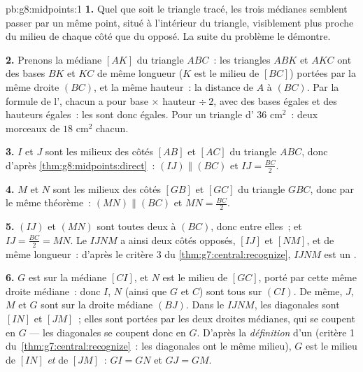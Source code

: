 \begin{solution}{pb:g8:midpoints:1}
\textbf{1.} Quel que soit le triangle tracé, les trois médianes
semblent passer par un même point, situé à l'intérieur du triangle,
visiblement plus proche du milieu de chaque côté que du 
opposé. La suite du problème le démontre.

\textbf{2.} Prenons la médiane $[AK]$ du triangle $ABC$~: les
triangles $ABK$ et $AKC$ ont des bases $BK$ et $KC$ de même longueur
($K$ est le milieu de $[BC]$) portées par la même droite $(BC)$, et
la même hauteur~: la distance de $A$ à $(BC)$. Par la formule de
l', chacun a pour  base $\times$ hauteur $\div\ 2$, avec des
bases égales et des hauteurs égales~: les  sont donc égales.
Pour un triangle d' $36$ cm$^2$~: deux morceaux de $18$ cm$^2$
chacun.

\textbf{3.} $I$ et $J$ sont les milieux des côtés $[AB]$ et $[AC]$
du triangle $ABC$, donc d'après \cref{thm:g8:midpoints:direct}~:
$(IJ) \parallel (BC)$ et $IJ = \frac{BC}{2}$.

\textbf{4.} $M$ et $N$ sont les milieux des côtés $[GB]$ et $[GC]$
du triangle $GBC$, donc par le même théorème~:
$(MN) \parallel (BC)$ et $MN = \frac{BC}{2}$.

\textbf{5.} $(IJ)$ et $(MN)$ sont toutes deux  à $(BC)$,
donc  entre elles~; et $IJ = \frac{BC}{2} = MN$. Le
 $IJNM$ a ainsi deux côtés opposés, $[IJ]$ et $[NM]$,
 et de même longueur~: d'après le critère 3 du
\cref{thm:g7:central:recognize}, $IJNM$ est un .

\textbf{6.} $G$ est sur la médiane $[CI]$, et $N$ est le milieu de
$[GC]$,  porté par cette même droite médiane~: donc $I$, $N$
(ainsi que $G$ et $C$) sont tous sur $(CI)$. De même, $J$, $M$ et
$G$ sont sur la droite médiane $(BJ)$. Dans le 
$IJNM$, les diagonales sont $[IN]$ et $[JM]$~; elles sont portées
par les deux droites médianes, qui se coupent en $G$ --- les
diagonales se coupent donc en $G$. D'après la \emph{définition} d'un
 (critère 1 du~\cref{thm:g7:central:recognize}~: les
diagonales ont le même milieu), $G$ est le milieu de $[IN]$
\emph{et} de $[JM]$~: $GI = GN$ et $GJ = GM$.


\end{solution}
